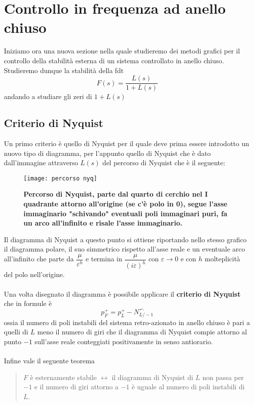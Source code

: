 \documentclass[a4paper]{article}
\begin{document}
	
	
	
	\section{Controllo in frequenza ad anello chiuso}
	Iniziamo ora una nuova sezione nella quale studieremo dei metodi grafici per il controllo della stabilità esterna di un sistema controllato in anello chiuso. Studieremo dunque la stabilità della fdt \[F(s)=\dfrac{L(s)}{1+L(s)}\] andando a studiare gli zeri di $ 1+L(s) $
	\subsection{Criterio di Nyquist}
	Un primo criterio è quello di Nyquist per il quale deve prima essere introdotto un nuovo tipo di diagramma, per l'appunto quello di Nyquist che è dato dall'immagine attraverso $ L(s) $ del percorso di Nyquist che è il seguente:
	
	\begin{figure}[H]
		\centering
		\texttt{[image: percorso nyq]}
		\caption{\textbf{Percorso di Nyquist, parte dal quarto di cerchio nel I quadrante attorno all'origine (se c'è polo in 0), segue l'asse immaginario "schivando" eventuali poli immaginari puri, fa un arco all'infinito e risale l'asse immaginario. }}
	\end{figure}
	Il diagramma di Nyquist a questo punto si ottiene riportando nello stesso grafico il diagramma polare, il suo simmetrico rispetto all'asse reale e un eventuale arco all'infinito che parte da $ \dfrac{\mu}{\varepsilon^h} $ e termina in $ \dfrac{\mu}{(i\varepsilon)^h} $ con $ \varepsilon\to0 $ e con $ h $ molteplicità del polo nell'origine.
	\\\\Una volta disegnato il diagramma è possibile applicare il \textbf{criterio di Nyquist} che in formule è 
	\[p_F^+=p_L^+-N_{L/-1}^{\curvearrowleft}\]
	ossia il numero di poli instabili del sistema retro-azionato in anello chiuso è pari a quelli di $L$ meno il numero di giri che il diagramma di Nyquist compie attorno al punto $-1$ sull'asse reale conteggiati positivamente in senso antiorario. 
	\\\\Infine vale il seguente teorema
	\begin{quote}
		$F$ è esternamente stabile $\leftrightarrow$ il diagramma di Nyquist di $L$ non passa per $-1$ e il numero di giri attorno a $-1$ è uguale al numero di poli instabili di $L$.
	\end{quote}
	
\end{document}
